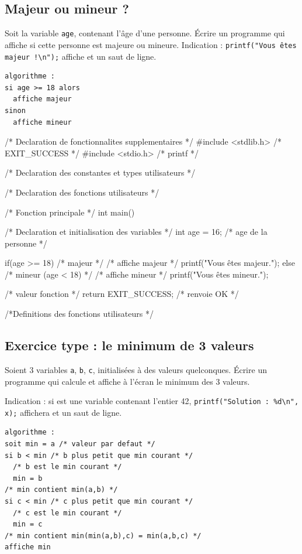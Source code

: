 \subsection{Majeur ou mineur ?}

Soit la variable \verb|age|, contenant l'âge d'une personne. Écrire un
programme qui affiche si cette personne est majeure ou
mineure. Indication : \verb|printf("Vous êtes majeur !\n");| affiche
 et un saut de ligne.

\begin{correction}
\begin{verbatim}
algorithme :
si age >= 18 alors 
  affiche majeur
sinon 
  affiche mineur
\end{verbatim}
\begin{listing}{1}
/* Declaration de fonctionnalites supplementaires */
#include <stdlib.h> /* EXIT_SUCCESS */
#include <stdio.h> /* printf */

/* Declaration des constantes et types utilisateurs */

/* Declaration des fonctions utilisateurs */

/* Fonction principale */
int main()
{
    /* Declaration et initialisation des variables */
    int age = 16; /* age de la personne */

    if(age >= 18) /* majeur */
    {
	/* affiche majeur */
	printf("Vous êtes majeur.\n");
    }
    else /* mineur (age < 18) */
    {
	/* affiche mineur */
	printf("Vous êtes mineur.\n");
    }
    
    /* valeur fonction */
    return EXIT_SUCCESS; /* renvoie OK */
}

/*Definitions des fonctions utilisateurs */
\end{listing}
\end{correction}

\subsection{Exercice type :  le minimum de 3 valeurs}

Soient 3 variables \verb|a|, \verb|b|, \verb|c|, initialisées à des
valeurs quelconques. Écrire un programme qui calcule et affiche à
l'écran le minimum des 3 valeurs.  

Indication : si  est une variable contenant l'entier 42,
\verb|printf("Solution : %d\n", x);| affichera  et
un saut de ligne.

\begin{correction}
\begin{verbatim}
algorithme :
soit min = a /* valeur par defaut */
si b < min /* b plus petit que min courant */
  /* b est le min courant */
  min = b
/* min contient min(a,b) */
si c < min /* c plus petit que min courant */
  /* c est le min courant */
  min = c
/* min contient min(min(a,b),c) = min(a,b,c) */
affiche min
\end{verbatim}
\begin{listing}{1}
\end{listing}
\end{correction}

